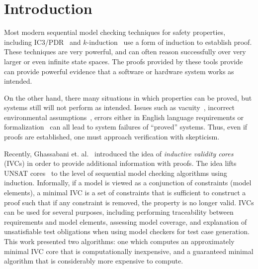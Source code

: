 \section{Introduction}
\label{sec:intro}
Most modern sequential model checking techniques for safety properties, including IC3/PDR~\cite{Een2011:PDR} and $k$-induction~\cite{SheeranSS00} use a form of induction to establish proof.  These techniques are very powerful, and can often reason successfully over very larger or even infinite state spaces.  The proofs provided by these tools provide can provide powerful evidence that a software or hardware system works as intended.

On the other hand, there many situations in which properties can be proved, but systems still will not perform as intended.  Issues such as vacuity~\cite{}, incorrect environmental assumptions~\cite{}, errors either in English language requirements or formalization~\cite{} can all lead to system failures of ``proved'' systems.  Thus, even if proofs are established, one must approach verification with skepticism.

Recently, Ghassabani et. al.~\cite{Ghass16} introduced the idea of {\em inductive validity cores} (IVCs) in order to provide additional information with proofs.  The idea lifts UNSAT cores~\cite{zhang2003extracting} to the level of sequential model checking algorithms using induction.  Informally, if a model is viewed as a conjunction of constraints (model elements), a minimal IVC is a set of constraints that is sufficient to construct a proof such that if any constraint is removed, the property is no longer valid. IVCs can be used for several purposes, including performing traceability between requirements and model elements, assessing model coverage, and explanation of unsatisfiable test obligations when using model checkers for test case generation.~
This work presented two algorithms: one which computes an approximately minimal IVC core that is computationally inexpensive, and a guaranteed minimal algorithm that is considerably more expensive to compute.

